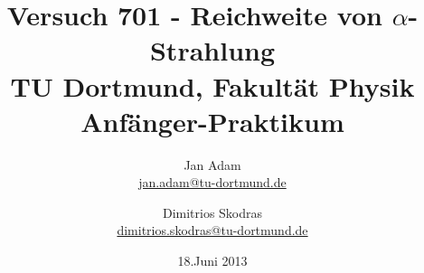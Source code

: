 



\title{Versuch 701 - Reichweite von $\alpha$-Strahlung\\				%
\large TU Dortmund, Fakultät Physik\\ 
\normalsize Anfänger-Praktikum}

\author{Jan Adam\\			%
{\small \href{jan.adam@tu-dortmund.de}{jan.adam@tu-dortmund.de}}	%
\and						%
Dimitrios Skodras\\					%
{\small \href{dimitrios.skodras@tu-dortmund.de}{dimitrios.skodras@tu-dortmund.de}}		%
}
\date{18.Juni 2013}				%





\maketitle					%
\thispagestyle{empty} 				%



\tableofcontents


\newpage					%


